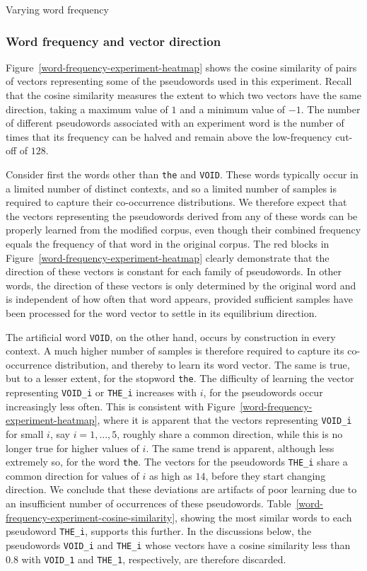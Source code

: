 \documentclass{article} %
\newcommand{\word}[1]{\texttt{#1}}
\begin{document}
\begin{section}{Varying word frequency}
\subsubsection{Word frequency and vector direction}\label{WFVE-direction}
Figure~\ref{word-frequency-experiment-heatmap} shows the cosine
similarity of pairs of vectors representing some of the pseudowords used in
this experiment.  Recall that the cosine similarity measures the extent
to which two vectors have the same direction, taking a maximum value of
$1$ and a minimum value of $-1$.  The number of different pseudowords
associated with an experiment word is the number of times that its
frequency can be halved and remain above the low-frequency cut-off of
$128$.

Consider first the words other than \word{the} and \word{VOID}.  These
words typically occur in a limited number of distinct contexts, and so a
limited number of samples is required to capture their co-occurrence
distributions.  We therefore expect that the vectors representing the
pseudowords derived from any of these words can be properly learned from the
modified corpus, even though their combined frequency equals the
frequency of that word in the original corpus.  The red blocks in
Figure~\ref{word-frequency-experiment-heatmap} clearly demonstrate that
the direction of these vectors is constant for each family of pseudowords.
In other words, the direction of these vectors is only determined by the
original word and is independent of how often that word appears,
provided sufficient samples have been processed for the word vector to
settle in its equilibrium direction.

The artificial word \word{VOID}, on the other hand, occurs by
construction in every context.  A much higher number of samples is
therefore required to capture its co-occurrence distribution, and
thereby to learn its word vector.  The same is true, but to a lesser
extent, for the stopword \word{the}.  The difficulty of learning the
vector representing \word{VOID\_i} or \word{THE\_i} increases with $i$,
for the pseudowords occur increasingly less often.  This is consistent with
Figure~\ref{word-frequency-experiment-heatmap}, where it is apparent
that the vectors representing \word{VOID\_i} for small $i$, say $i = 1,
\dots, 5$, roughly share a common direction, while this is no longer
true for higher values of $i$.  The same trend is apparent, although
less extremely so, for the word \word{the}.  The vectors for the pseudowords
\word{THE\_i} share a common direction for values of $i$ as high as
$14$, before they start changing direction.  We conclude that these
deviations are artifacts of poor learning due to an insufficient number
of occurrences of these pseudowords.
Table~\ref{word-frequency-experiment-cosine-similarity}, showing the
most similar words to each pseudoword \word{THE\_i}, supports this further.
In the discussions below, the pseudowords \word{VOID\_i} and \word{THE\_i}
whose vectors have a cosine similarity less than $0.8$ with
\word{VOID\_1} and \word{THE\_1}, respectively, are therefore discarded.


\end{section}
\end{document}
